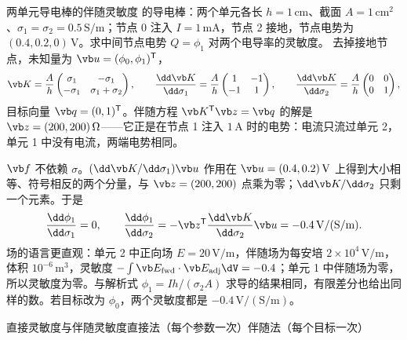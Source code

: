 \begin{example}[label=ex:framework-adjoint]{两单元导电棒的伴随灵敏度}
 的导电棒：两个单元各长 $h=1\,\mathrm{cm}$、截面 $A=1\,\mathrm{cm^2}$、$\sigma_1=\sigma_2=0.5\,\mathrm{S/m}$；节点 0 注入 $I=1\,\mathrm{mA}$，节点 2 接地，节点电势为 $(0.4,0.2,0)\,\mathrm V$。求中间节点电势 $Q=\phi_1$ 对两个电导率的灵敏度。
\solution
去掉接地节点，未知量为 $\vb u=(\phi_0,\phi_1)^{\mathsf T}$，
\begin{equation*}
\vb K=\frac{A}{h}\begin{pmatrix}\sigma_1&-\sigma_1\\-\sigma_1&\sigma_1+\sigma_2\end{pmatrix},\qquad
\frac{\dd\vb K}{\dd\sigma_1}=\frac{A}{h}\begin{pmatrix}1&-1\\-1&1\end{pmatrix},\qquad
\frac{\dd\vb K}{\dd\sigma_2}=\frac{A}{h}\begin{pmatrix}0&0\\0&1\end{pmatrix},
\end{equation*}
目标向量 $\vb q=(0,1)^{\mathsf T}$。伴随方程 $\vb K^{\mathsf T}\vb z=\vb q$ 的解是 $\vb z=(200,200)\,\Omega$——它正是在节点 1 注入 $1\,\mathrm A$ 时的电势：电流只流过单元 2，单元 1 中没有电流，两端电势相同。

$\vb f$ 不依赖 $\sigma$。$(\dd\vb K/\dd\sigma_1)\vb u$ 作用在 $\vb u=(0.4,0.2)\,\mathrm V$ 上得到大小相等、符号相反的两个分量，与 $\vb z=(200,200)$ 点乘为零；$\dd\vb K/\dd\sigma_2$ 只剩一个元素。于是
\begin{equation*}
\frac{\dd\phi_1}{\dd\sigma_1}=0,\qquad \frac{\dd\phi_1}{\dd\sigma_2}=-\vb z^{\mathsf T}\frac{\dd\vb K}{\dd\sigma_2}\vb u=-0.4\,\mathrm{V/(S/m)} .
\end{equation*}
场的语言更直观：单元 2 中正向场 $E=20\,\mathrm{V/m}$，伴随场为每安培 $2\times10^4\,\mathrm{V/m}$，体积 $10^{-6}\,\mathrm{m^3}$，灵敏度 $-\int\vb E_{\rm fwd}\cdot\vb E_{\rm adj}\dV=-0.4$；单元 1 中伴随场为零，所以灵敏度为零。与解析式 $\phi_1=Ih/(\sigma_2A)$ 求导的结果相同，有限差分也给出同样的数。若目标改为 $\phi_0$，两个灵敏度都是 $-0.4\,\mathrm{V/(S/m)}$。
\end{example}

\begin{compare}{直接灵敏度与伴随灵敏度}{直接法（每个参数一次）}{伴随法（每个目标一次）}
\end{compare}

